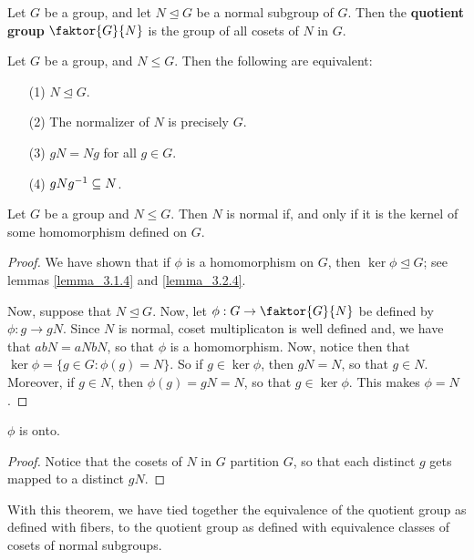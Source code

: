 \begin{definition}
  Let $G$ be a group, and let $N \unlhd G$ be a normal subgroup of $G$. Then
  the  \textbf{quotient group} $\faktor{G}{N}$ is the group of all cosets of
  $N$ in  $G$.
\end{definition}

\begin{lemma}\label{lemma_3.2.4}
  Let $G$ be a group, and  $N \leq G$. Then the following are equivalent:
  \begin{enumerate}
    \item[(1)] $N \unlhd G$.

    \item [(2)] The normalizer of $N$ is precisely  $G$.

    \item[(3)] $gN=Ng$ for all  $g \in G$.

    \item [(4)] $gNg^{-1} \subseteq N$.
  \end{enumerate}
\end{lemma}

\begin{theorem}\label{theorem_3.2.5}
  Let $G$ be a group and  $N \leq G$. Then  $N$ is normal if, and only if it
  is the kernel of some homomorphism defined on $G$.
\end{theorem}
\begin{proof}
  We have shown that if $\phi$ is a homomorphism on  $G$, then  $\ker{\phi}
  \unlhd G$; see lemmas \ref{lemma_3.1.4} and \ref{lemma_3.2.4}.

  Now, suppose that $N \unlhd G$. Now, let $\phi:G \rightarrow \faktor{G}{N}$
  be defined by $\phi:g \rightarrow gN$. Since $N$ is normal, coset
  multiplicaton is well defined and, we have that $abN=aNbN$, so that $\phi$
  is a homomorphism. Now, notice then that
  $\ker{\phi}=\{g \in G : \phi(g)=N\}$. So if $g \in \ker{\phi}$, then $gN=N$,
  so that $g \in N$. Moreover, if  $g \in N$, then  $\phi(g)=gN=N$, so that $g
  \in \ker{\phi}$. This makes $\phi=N$.
\end{proof}
\begin{corollary}
  $\phi$ is onto.
\end{corollary}
\begin{proof}
  Notice that the cosets of $N$ in  $G$ partition  $G$, so that each distinct
  $g$ gets mapped to a distinct $gN$.
\end{proof}
\begin{remark}
  With this theorem, we have tied together the equivalence of the quotient
  group as defined with fibers, to the quotient group as defined with
  equivalence classes of cosets of normal subgroups.
\end{remark}

